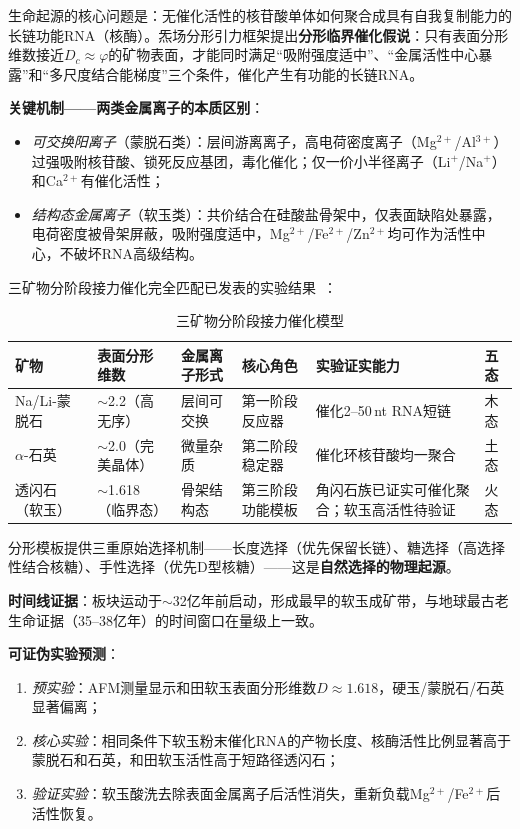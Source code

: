 \documentclass[12pt,a4paper,twocolumn]{article}
\renewcommand{\phi}{\varphi}
\begin{document}
生命起源的核心问题是：无催化活性的核苷酸单体如何聚合成具有自我复制能力的长链功能RNA（核酶）。炁场分形引力框架提出\textbf{分形临界催化假说}：只有表面分形维数接近$D_c \approx \phi$的矿物表面，才能同时满足``吸附强度适中''、``金属活性中心暴露''和``多尺度结合能梯度''三个条件，催化产生有功能的长链RNA。

\textbf{关键机制——两类金属离子的本质区别}：
\begin{itemize}
\item \textit{可交换阳离子}（蒙脱石类）：层间游离离子，高电荷密度离子（Mg$^{2+}$/Al$^{3+}$）过强吸附核苷酸、锁死反应基团，毒化催化；仅一价小半径离子（Li$^+$/Na$^+$）和Ca$^{2+}$有催化活性；
\item \textit{结构态金属离子}（软玉类）：共价结合在硅酸盐骨架中，仅表面缺陷处暴露，电荷密度被骨架屏蔽，吸附强度适中，Mg$^{2+}$/Fe$^{2+}$/Zn$^{2+}$均可作为活性中心，不破坏RNA高级结构。
\end{itemize}

三矿物分阶段接力催化完全匹配已发表的实验结果~\cite{Ferris1996}：

\begin{table}[H]
\centering
\footnotesize
\caption{三矿物分阶段接力催化模型}
\label{tab:three_mineral_catalysis}
\begin{tabular}{p{1.8cm}|p{1.8cm}|p{2.2cm}|p{2.8cm}|p{2.5cm}|p{1.2cm}}
\hline
\textbf{矿物} & \textbf{表面分形维数} & \textbf{金属离子形式} & \textbf{核心角色} & \textbf{实验证实能力} & \textbf{五态} \\
\hline
Na/Li-蒙脱石 & $\sim$2.2（高无序） & 层间可交换 & 第一阶段反应器 & 催化2--50\,nt RNA短链 & 木态 \\
$\alpha$-石英 & $\sim$2.0（完美晶体） & 微量杂质 & 第二阶段稳定器 & 催化环核苷酸均一聚合 & 土态 \\
透闪石（软玉） & $\sim$1.618（临界态） & 骨架结构态 & 第三阶段功能模板 & 角闪石族已证实可催化聚合；软玉高活性待验证 & 火态 \\
\hline
\end{tabular}
\end{table}

分形模板提供三重原始选择机制——长度选择（优先保留长链）、糖选择（高选择性结合核糖）、手性选择（优先D型核糖）——这是\textbf{自然选择的物理起源}。

\textbf{时间线证据}：板块运动于$\sim$32亿年前启动，形成最早的软玉成矿带，与地球最古老生命证据（35--38亿年）的时间窗口在量级上一致。

\textbf{可证伪实验预测}：
\begin{enumerate}
\item \textit{预实验}：AFM测量显示和田软玉表面分形维数$D \approx 1.618$，硬玉/蒙脱石/石英显著偏离；
\item \textit{核心实验}：相同条件下软玉粉末催化RNA的产物长度、核酶活性比例显著高于蒙脱石和石英，和田软玉活性高于短路径透闪石；
\item \textit{验证实验}：软玉酸洗去除表面金属离子后活性消失，重新负载Mg$^{2+}$/Fe$^{2+}$后活性恢复。
\end{enumerate}
\end{document}
